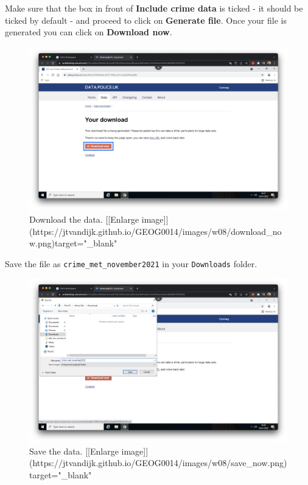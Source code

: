 \documentclass[
]{book}
\begin{document}
Make sure that the box in front of \textbf{Include crime data} is ticked - it should be ticked by default - and proceed to click on \textbf{Generate file}. Once your file is generated you can click on \textbf{Download now}.

\begin{figure}

{\centering \includegraphics[width=850pt]{images/w08/download_now} 

}

\caption{Download the data. [[Enlarge image]](https://jtvandijk.github.io/GEOG0014/images/w08/download_now.png){target="_blank"}}\label{fig:data-police-download}
\end{figure}

Save the file as \texttt{crime\_met\_november2021} in your \texttt{Downloads} folder.

\begin{figure}

{\centering \includegraphics[width=850pt]{images/w08/save_now} 

}

\caption{Save the data. [[Enlarge image]](https://jtvandijk.github.io/GEOG0014/images/w08/save_now.png){target="_blank"}}\label{fig:data-police-save}
\end{figure}
\end{document}
